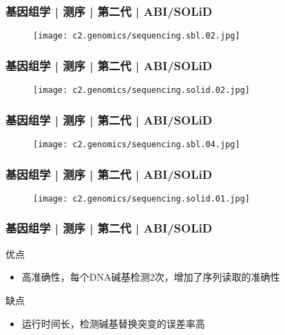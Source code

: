 \begin{frame}
  \frametitle{基因组学 | 测序 | 第二代 | ABI/SOLiD}
  \begin{figure}
    \centering
    \texttt{[image: c2.genomics/sequencing.sbl.02.jpg]}
  \end{figure}
\end{frame}


\begin{frame}
  \frametitle{基因组学 | 测序 | 第二代 | ABI/SOLiD}
  \begin{figure}
    \centering
    \texttt{[image: c2.genomics/sequencing.solid.02.jpg]}
  \end{figure}
\end{frame}

\begin{frame}
  \frametitle{基因组学 | 测序 | 第二代 | ABI/SOLiD}
  \begin{figure}
    \centering
    \texttt{[image: c2.genomics/sequencing.sbl.04.jpg]}
  \end{figure}
\end{frame}

\begin{frame}
  \frametitle{基因组学 | 测序 | 第二代 | ABI/SOLiD}
  \begin{figure}
    \centering
    \texttt{[image: c2.genomics/sequencing.solid.01.jpg]}
  \end{figure}
\end{frame}

\begin{frame}
  \frametitle{基因组学 | 测序 | 第二代 | ABI/SOLiD}
  \begin{block}{优点}
    \begin{itemize}
      \item 高准确性，每个DNA碱基检测2次，增加了序列读取的准确性
    \end{itemize}
  \end{block}
  \pause
  \begin{block}{缺点}
    \begin{itemize}
      \item 运行时间长，检测碱基替换突变的误差率高
    \end{itemize}
  \end{block}
\end{frame}

